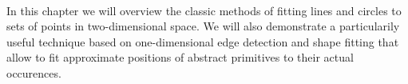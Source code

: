 \paragraph*{}
In this chapter we will overview the classic methods of fitting lines and circles to sets of points in two-dimensional space. We will also demonstrate a particularily useful technique based on one-dimensional edge detection and shape fitting that allow to fit approximate positions of abstract primitives to their actual occurences.